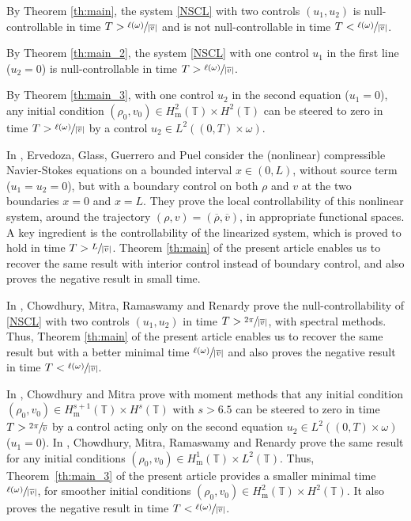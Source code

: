 \documentclass[JEP,XML,SOM,Unicode,NoEqCountersInSection]{cedram}
\theoremstyle{plain}
\theoremstyle{definition}
\theoremstyle{remark}
\newcommand{\set}{\mathbb}
\newcommand{\T}{\set{T}}
\newcommand{\m}{{\mathrm m}}
\begin{document}
By Theorem \ref{th:main}, the system \eqref{NSCL} with two controls $(u_1,u_2)$ is null-controllable in time $T>\sfrac{\ell(\omega)}{|\overline{v}|}$ and is not null-controllable in time $T<\sfrac{\ell(\omega)}{|\overline{v}|}$.

By Theorem \ref{th:main_2}, the system \eqref{NSCL} with one control $u_1$ in the first line (\ie $u_2=0$) is null-controllable in time $T>\sfrac{\ell(\omega)}{|\overline{v}|}$.

By Theorem \ref{th:main_3}, with one control $u_2$ in the second equation (\ie $u_1=0$), any initial condition $(\rho_0,v_0)\in H^2_\m(\T)\times H^2(\T)$ can be steered to zero in time $T>\sfrac{\ell(\omega)}{|\overline{v}|}$ by a control $u_2 \in L^2((0,T)\times\omega)$.

In \cite{ervedoza_2012}, Ervedoza, Glass, Guerrero and Puel consider the (nonlinear) compressible Navier-Stokes equations on a bounded interval $x \in (0,L)$, without source term (\ie $u_1=u_2=0$), but with a boundary control on both $\rho$ and $v$ at the two boundaries $x=0$ and $x=L$. They prove the local controllability of this nonlinear system, around the trajectory $(\rho,v)=(\overline{\rho},\overline{v})$, in appropriate functional spaces. A key ingredient is the controllability of the linearized system, which is proved to hold in time $T>\sfrac{L}{|\overline{v}|}$. Theorem \ref{th:main} of the present article enables us to recover the same result with interior control instead of boundary control, and also proves the negative result in small time.

In \cite[Th.\,1.4]{chowdhury_2014}, Chowdhury, Mitra, Ramaswamy and Renardy prove the null-controllability of \eqref{NSCL} with two controls $(u_1,u_2)$ in time $T>\sfrac{2\pi}{|\overline{v}|}$, with spectral methods. Thus, Theorem \ref{th:main} of the present article enables us to recover the same result but with a better minimal time $\sfrac{\ell(\omega)}{|\overline{v}|}$ and also proves the negative result in time $T<\sfrac{\ell(\omega)}{|\overline{v}|}$.

In \cite[Th.\,1.3]{chowdhury_2015}, Chowdhury and Mitra prove with moment methods that any initial condition $(\rho_0,v_0)\in H^{s+1}_\m(\T)\times H^{s}(\mathbb{T})$ with $s> 6.5$ can be steered to zero in time $T>\sfrac{2\pi}{\overline{v}}$ by a control acting only on the second equation $u_2 \in L^2((0,T)\times\omega)$ (\ie $u_1=0$).
In \cite[Th.\,1.2]{chowdhury_2014}, Chowdhury, Mitra, Ramaswamy and Renardy prove the same result for any initial conditions $(\rho_0,v_0)\in H^1_\m(\T) \times L^2(\T)$. Thus, Theorem~\ref{th:main_3} of the present article provides a smaller minimal time $\sfrac{\ell(\omega)}{|\overline{v}|}$, for smoother initial conditions $(\rho_0,v_0)\in H^2_\m(\T)\times H^2(\T)$. It also proves the negative result in time $T<\nobreak\sfrac{\ell(\omega)}{|\overline{v}|}$.
\end{document}
